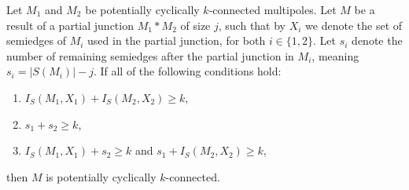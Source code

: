 \documentclass[12pt, twoside]{book}
\begin{document}
\begin{theorem}\label{th:potentially-cyclically-connected-independent-semiedge-index}
	Let $M_1$ and $M_2$ be potentially cyclically $k$-connected multipoles. Let $M$ be a result of a partial junction $M_1*M_2$ of size $j$, such that by $X_i$ we denote the set of semiedges of $M_i$ used in the partial junction, for both $i\in \{1,2\}$. Let $s_i$ denote the number of remaining semiedges after the partial junction in $M_i$, meaning ${s_i=|S(M_i)|-j}$. If all of the following conditions hold:
	\begin{enumerate}[label=(\roman*)]
		\item $I_S(M_1, X_1)+I_S(M_2, X_2)\geq k$,
		\item $s_1+s_2\geq k$,
		\item $I_S(M_1, X_1)+s_2\geq k$ and $s_1+I_S(M_2, X_2)\geq k$,
	\end{enumerate}
	then $M$ is potentially cyclically $k$-connected.
\end{theorem}
\end{document}
